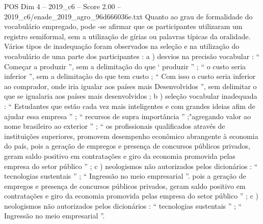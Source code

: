 \begin{textsample}{POS Dim 4 – 2019\_c6 – Score 2.00 – 2019\_c6/enade\_2019\_agro\_96d666036e.txt}
Quanto ao grau de formalidade do vocabulário empregado, pode -se afirmar que os participantes utilizaram um registro semiformal, sem a utilização de gírias ou palavras típicas da oralidade.
Vários tipos de inadequação foram observados na seleção e na utilização do vocabulário de uma parte dos participantes : a ) desvios na precisão vocabular : “ Começar a produzir ”, sem a delimitação do que ‘ produzir ” ; “ o custo seria inferior ”, sem a delimitação do que tem custo ; “ Com isso o custo seria inferior ao comprador, onde iria igualar aos países mais Desenvolvidos ”, sem delimitar o que se igualaria aos países mais desenvolvidos ; b ) seleção vocabular inadequada : “ Estudantes que estão cada vez mais inteligentes e com grandes ideias afim de ajudar essa empresa ” ; “ recursos de supra importância ” ;"agregando valor ao nome brasileiro ao exterior ” ; “ os profissionais qualificados através de instituições superiores, promovem desempenho econômico abrangente à economia do país, pois a geração de empregos e presença de concursos públicos privados, geram saldo positivo em contratações e giro da economia promovida pelas empresa do setor público ” ; c ) neologismos não autorizados pelos dicionários : “ tecnologias sustentais ” ; “ Ingressão no meio empresarial ”. pois a geração de empregos e presença de concursos públicos privados, geram saldo positivo em contratações e giro da economia promovida pelas empresa do setor público ” ; c ) neologismos não autorizados pelos dicionários : “ tecnologias sustentais ” ; “ Ingressão no meio empresarial ”.

\end{textsample}
